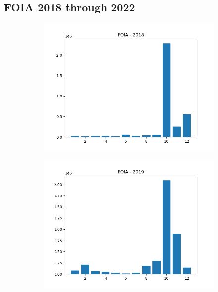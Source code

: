 \documentclass{article}
\begin{document}
\subsection*{FOIA 2018 through 2022}
\begin{figure}[H]
    \begin{subfigure}{.5\textwidth}
        \centering
        \includegraphics[width=\textwidth]{../../output/figures/annual_source_distribution/FOIA_data_dist_2018.png}
    \end{subfigure}
    \begin{subfigure}{.5\textwidth}
        \centering
        \includegraphics[width=\textwidth]{../../output/figures/annual_source_distribution/FOIA_data_dist_2019.png}

\end{subfigure}
\end{figure}
\end{document}
